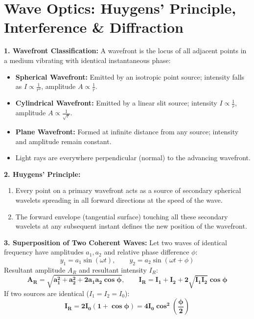 \documentclass[10pt,a4paper]{article}
\begin{document}
\section{Wave Optics: Huygens' Principle, Interference \& Diffraction}

\begin{conceptbox}
\textbf{1. Wavefront Classification:}
A wavefront is the locus of all adjacent points in a medium vibrating with identical instantaneous phase:
\begin{itemize}
  \item \textbf{Spherical Wavefront:} Emitted by an isotropic point source; intensity falls as $I \propto \frac{1}{r^2}$, amplitude $A \propto \frac{1}{r}$.
  \item \textbf{Cylindrical Wavefront:} Emitted by a linear slit source; intensity $I \propto \frac{1}{r}$, amplitude $A \propto \frac{1}{\sqrt{r}}$.
  \item \textbf{Plane Wavefront:} Formed at infinite distance from any source; intensity and amplitude remain constant.
  \item Light rays are everywhere perpendicular (normal) to the advancing wavefront.
\end{itemize}
\textbf{2. Huygens' Principle:}
\begin{enumerate}
  \item Every point on a primary wavefront acts as a source of secondary spherical wavelets spreading in all forward directions at the speed of the wave.
  \item The forward envelope (tangential surface) touching all these secondary wavelets at any subsequent instant defines the new position of the wavefront.
\end{enumerate}
\textbf{3. Superposition of Two Coherent Waves:}
Let two waves of identical frequency have amplitudes $a_1, a_2$ and relative phase difference $\phi$:
\begin{equation}
  y_1 = a_1 \sin(\omega t), \qquad y_2 = a_2 \sin(\omega t + \phi)
\end{equation}
Resultant amplitude $A_R$ and resultant intensity $I_R$:
\begin{equation}
  \mathbf{A_R = \sqrt{a_1^2 + a_2^2 + 2a_1 a_2 \cos\phi}}, \qquad \mathbf{I_R = I_1 + I_2 + 2\sqrt{I_1 I_2}\cos\phi}
\end{equation}
If two sources are identical ($I_1 = I_2 = I_0$):
\begin{equation}
  \mathbf{I_R = 2I_0(1 + \cos\phi) = 4I_0 \cos^2\left(\frac{\phi}{2}\right)}

\end{equation}
\end{conceptbox}
\end{document}
